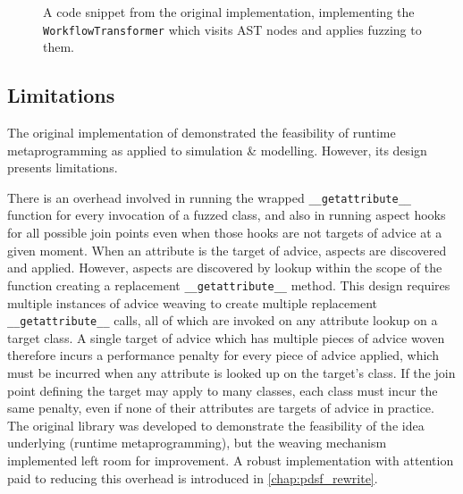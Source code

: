\begin{figure}
    \centering
    
    \caption{A code snippet from the original \pdsf implementation, implementing
    the \lstinline{WorkflowTransformer} which visits AST nodes and applies
    fuzzing to them.}
    \label{fig:workflowtransformer_implementation}
\end{figure}


\subsection{Limitations}\label{subsec:prior_work_pdsf_limitations}

The original implementation of \pdsf demonstrated the feasibility
of runtime metaprogramming as applied to simulation \& modelling.
However, its design presents limitations.

There is an overhead involved in running the wrapped
\lstinline{__getattribute__} function for every invocation of a fuzzed class,
and also in running aspect hooks for all possible join points even when those
hooks are not targets of advice at a given moment. When an attribute is the
target of advice, aspects are discovered and applied. However, aspects are
discovered by lookup within the scope of the function creating a replacement
\lstinline{__getattribute__} method. This design requires multiple instances
of advice weaving to create multiple replacement \lstinline{__getattribute__}
calls, all of which are invoked on any attribute lookup on a target class. A single target of
advice which has multiple pieces of advice woven therefore incurs a performance
penalty for every piece of advice applied, which must be incurred when any
attribute is looked up on the target's class. If the join point defining the
target may apply to many classes, each class must incur the same penalty, even
if none of their attributes are targets of advice in practice. The original
library was developed to demonstrate the feasibility of the idea underlying
\pdsf{} (runtime metaprogramming), but the weaving mechanism implemented left
room for improvement. A robust implementation with attention paid to reducing
this overhead is introduced in \cref{chap:pdsf_rewrite}.


